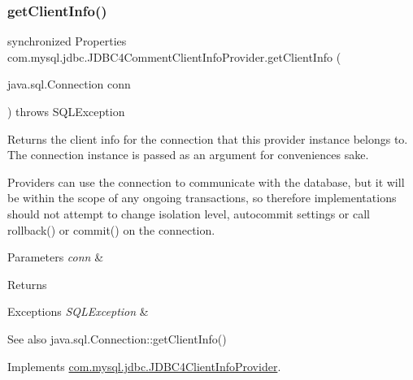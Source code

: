 \subsubsection{\texorpdfstring{get\+Client\+Info()}{getClientInfo()}\hspace{0.1cm}{\footnotesize\ttfamily [1/2]}}
{\footnotesize\ttfamily synchronized Properties com.\+mysql.\+jdbc.\+J\+D\+B\+C4\+Comment\+Client\+Info\+Provider.\+get\+Client\+Info (\begin{DoxyParamCaption}\item[{java.\+sql.\+Connection}]{conn }\end{DoxyParamCaption}) throws S\+Q\+L\+Exception}

Returns the client info for the connection that this provider instance belongs to. The connection instance is passed as an argument for convenience\textquotesingle{}s sake.

Providers can use the connection to communicate with the database, but it will be within the scope of any ongoing transactions, so therefore implementations should not attempt to change isolation level, autocommit settings or call rollback() or commit() on the connection.


\begin{DoxyParams}{Parameters}
{\em conn} & \\
\hline
\end{DoxyParams}
\begin{DoxyReturn}{Returns}

\end{DoxyReturn}

\begin{DoxyExceptions}{Exceptions}
{\em S\+Q\+L\+Exception} & \\
\hline
\end{DoxyExceptions}
\begin{DoxySeeAlso}{See also}
java.\+sql.\+Connection\+::get\+Client\+Info() 
\end{DoxySeeAlso}


Implements \mbox{\hyperlink{interfacecom_1_1mysql_1_1jdbc_1_1_j_d_b_c4_client_info_provider_a7e0893a815f6b668deec04d40d60e985}{com.\+mysql.\+jdbc.\+J\+D\+B\+C4\+Client\+Info\+Provider}}.

\mbox{\label{classcom_1_1mysql_1_1jdbc_1_1_j_d_b_c4_comment_client_info_provider_ad85c93d4ed96cddff56207a7e315ba93}} 
